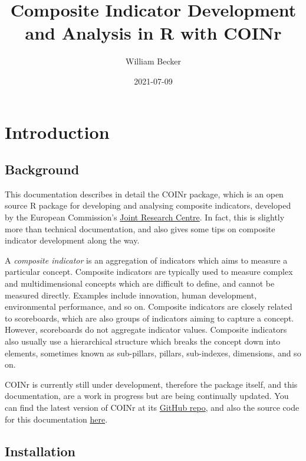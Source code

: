 \documentclass[
]{book}
\title{Composite Indicator Development and Analysis in R with COINr}
\author{William Becker}
\date{2021-07-09}
\begin{document}
\maketitle

{
\setcounter{tocdepth}{1}
\tableofcontents
}
\hypertarget{introduction}{%
\chapter{Introduction}\label{introduction}}

\hypertarget{background}{%
\section{Background}\label{background}}

This documentation describes in detail the COINr package, which is an open source R package for developing and analysing composite indicators, developed by the European Commission's \href{https://knowledge4policy.ec.europa.eu/composite-indicators/about_en}{Joint Research Centre}. In fact, this is slightly more than technical documentation, and also gives some tips on composite indicator development along the way.

A \emph{composite indicator} is an aggregation of indicators which aims to measure a particular concept. Composite indicators are typically used to measure complex and multidimensional concepts which are difficult to define, and cannot be measured directly. Examples include innovation, human development, environmental performance, and so on. Composite indicators are closely related to scoreboards, which are also groups of indicators aiming to capture a concept. However, scoreboards do not aggregate indicator values. Composite indicators also usually use a hierarchical structure which breaks the concept down into elements, sometimes known as sub-pillars, pillars, sub-indexes, dimensions, and so on.

COINr is currently still under development, therefore the package itself, and this documentation, are a work in progress but are being continually updated. You can find the latest version of COINr at its \href{https://github.com/bluefoxr/COINr}{GitHub repo}, and also the source code for this documentation \href{https://github.com/bluefoxr/COINrDoc}{here}.

\hypertarget{installation}{%
\section{Installation}\label{installation}}
\end{document}
